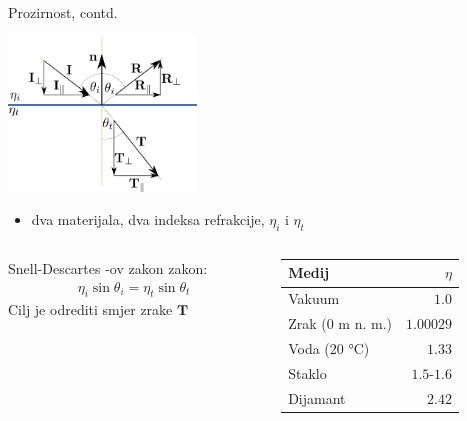 \documentclass[9pt]{beamer}
\begin{document}
\begin{frame}{Prozirnost, contd.}

\begin{center}
\includegraphics[width=5cm]{slike/prozirnost.png}
\end{center}
\begin{itemize}
\item dva materijala, dva indeksa refrakcije, $\eta_i$ i $\eta_t$
\end{itemize}
\begin{columns}
	\begin{column}{0.5\textwidth}
		Snell-Descartes -ov zakon zakon:
		\begin{align*}
		\eta_i \sin \theta_i = \eta_t \sin\theta_t%
		\end{align*}
		Cilj je odrediti smjer zrake $\mathbf{T}$
	\end{column}
	\begin{column}{0.5\textwidth}
		\begin{center}
			\begin{tabular}{ l r } 
				\textbf{Medij} & $\eta$ \\
				\hline
				Vakuum & $1.0$  \\ 
				Zrak ($0$ m n. m.) & $1.00029$  \\ 
				Voda ($20$ °C) & $1.33$  \\ 
				Staklo & $1.5$-$1.6$  \\ 
				Dijamant & $2.42$  \\ 
				\hline
			\end{tabular}
		\end{center}
	\end{column}
\end{columns}

\end{frame}
\end{document}
